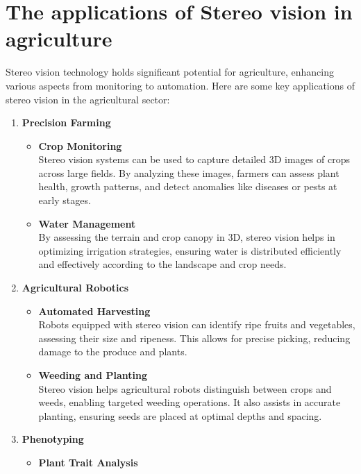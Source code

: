 \documentclass[22pt]{report}
\begin{document}
    \section{The applications of Stereo vision in agriculture}
        Stereo vision technology holds significant potential for agriculture, enhancing various aspects from monitoring to automation. Here are some key applications of stereo vision in the agricultural sector:
        \begin{enumerate}
            \item \textbf{Precision Farming}
                \begin{itemize}
                    \item \textbf{Crop Monitoring} \\
                        Stereo vision systems can be used to capture detailed 3D images of crops across large fields. By analyzing these images, farmers can assess plant health, growth patterns, and detect anomalies like diseases or pests at early stages.
                    \item \textbf{Water Management}\\
                        By assessing the terrain and crop canopy in 3D, stereo vision helps in optimizing irrigation strategies, ensuring water is distributed efficiently and effectively according to the landscape and crop needs.
                \end{itemize}
            \item \textbf{Agricultural Robotics}
                \begin{itemize}
                    \item \textbf{Automated Harvesting}\\
                        Robots equipped with stereo vision can identify ripe fruits and vegetables, assessing their size and ripeness. This allows for precise picking, reducing damage to the produce and plants.
                    \item \textbf{Weeding and Planting}\\
                        Stereo vision helps agricultural robots distinguish between crops and weeds, enabling targeted weeding operations. It also assists in accurate planting, ensuring seeds are placed at optimal depths and spacing.
                \end{itemize}
            \item \textbf{Phenotyping}
                 \begin{itemize}
                     \item \textbf{Plant Trait Analysis}\\

\end{itemize}
\end{enumerate}
\end{document}
